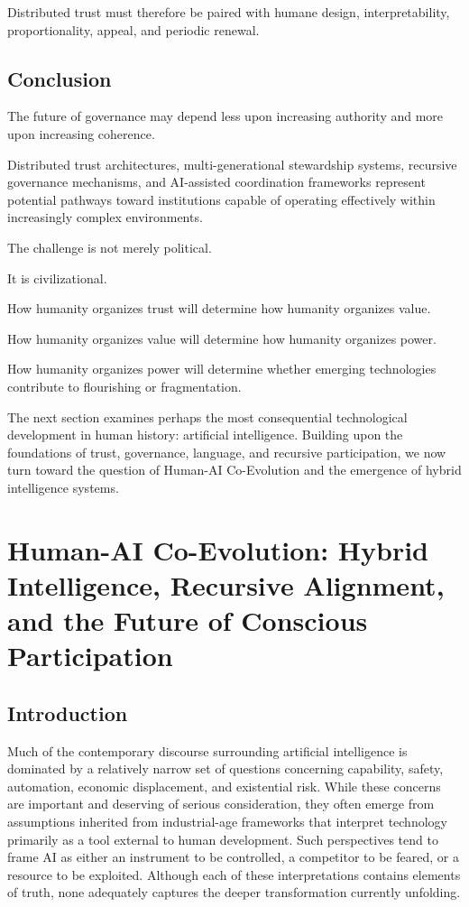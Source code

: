 \documentclass[12pt]{article}
\begin{document}
Distributed trust must therefore be paired with humane design, interpretability, proportionality, appeal, and periodic renewal.

\subsection{Conclusion}

The future of governance may depend less upon increasing authority and more upon increasing coherence.

Distributed trust architectures, multi-generational stewardship systems, recursive governance mechanisms, and AI-assisted coordination frameworks represent potential pathways toward institutions capable of operating effectively within increasingly complex environments.

The challenge is not merely political.

It is civilizational.

How humanity organizes trust will determine how humanity organizes value.

How humanity organizes value will determine how humanity organizes power.

How humanity organizes power will determine whether emerging technologies contribute to flourishing or fragmentation.

The next section examines perhaps the most consequential technological development in human history: artificial intelligence. Building upon the foundations of trust, governance, language, and recursive participation, we now turn toward the question of Human-AI Co-Evolution and the emergence of hybrid intelligence systems.

\section{Human-AI Co-Evolution: Hybrid Intelligence, Recursive Alignment, and the Future of Conscious Participation}

\subsection{Introduction}

Much of the contemporary discourse surrounding artificial intelligence is dominated by a relatively narrow set of questions concerning capability, safety, automation, economic displacement, and existential risk. While these concerns are important and deserving of serious consideration, they often emerge from assumptions inherited from industrial-age frameworks that interpret technology primarily as a tool external to human development. Such perspectives tend to frame AI as either an instrument to be controlled, a competitor to be feared, or a resource to be exploited. Although each of these interpretations contains elements of truth, none adequately captures the deeper transformation currently unfolding.
\end{document}
